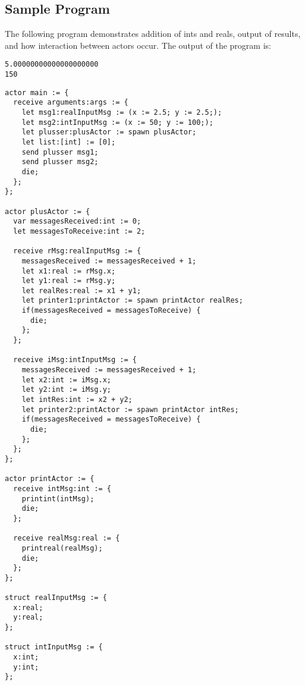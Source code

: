 \subsection{Sample Program}

The following program demonstrates addition of ints and reals, output of results, and how interaction between actors occur. The output of the program is:

\begin{verbatim}
5.00000000000000000000
150
\end{verbatim}

\begin{lstlisting}[style = tldr]
actor main := {
  receive arguments:args := {
    let msg1:realInputMsg := (x := 2.5; y := 2.5;);
    let msg2:intInputMsg := (x := 50; y := 100;);
    let plusser:plusActor := spawn plusActor;
    let list:[int] := [0];
    send plusser msg1;
    send plusser msg2;
    die;
  };
};

actor plusActor := {
  var messagesReceived:int := 0;
  let messagesToReceive:int := 2;

  receive rMsg:realInputMsg := {
    messagesReceived := messagesReceived + 1;
    let x1:real := rMsg.x;
    let y1:real := rMsg.y;
    let realRes:real := x1 + y1;
    let printer1:printActor := spawn printActor realRes;
    if(messagesReceived = messagesToReceive) { 
      die;
    };
  };

  receive iMsg:intInputMsg := {
    messagesReceived := messagesReceived + 1;
    let x2:int := iMsg.x;
    let y2:int := iMsg.y;
    let intRes:int := x2 + y2;
    let printer2:printActor := spawn printActor intRes;
    if(messagesReceived = messagesToReceive) { 
      die;
    };
  };
};

actor printActor := {
  receive intMsg:int := {
    printint(intMsg);
    die;
  };

  receive realMsg:real := {
    printreal(realMsg);
    die;
  };
};

struct realInputMsg := {
  x:real;
  y:real;
};

struct intInputMsg := {
  x:int;
  y:int;
};
\end{lstlisting}